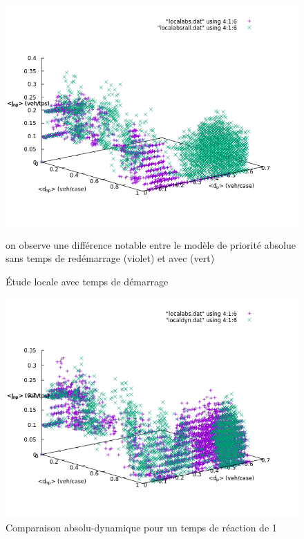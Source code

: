 \documentclass[11pt]{article}
\begin{document}
\begin{figure}[h]
	 	\begin{center}
	 		\includegraphics[scale=0.4]{./diagrammes-fondamentaux/localabs0w1w}
	 	\end{center}
	 	\caption{\label{rdem}Étude locale avec temps de démarrage}
	 	on observe une différence notable entre le modèle de priorité absolue sans temps de redémarrage (violet) et avec (vert)
	 \end{figure}

\begin{figure}[h]
		\begin{center}
			\includegraphics[scale=0.35]{./diagrammes-fondamentaux/localabsdyn1w}
		\end{center}
		\caption{\label{labstr}Comparaison absolu-dynamique pour un temps de réaction de 1}
\end{figure}
\end{document}
